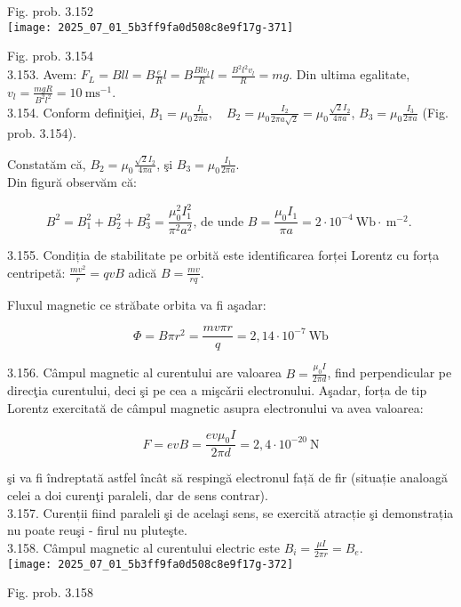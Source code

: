 Fig. prob. 3.152\\
\texttt{[image: 2025\_07\_01\_5b3ff9fa0d508c8e9f17g-371]}

Fig. prob. 3.154\\
3.153. Avem: $F_{L}=B l l=B \frac{e}{R} l=B \frac{B l v_{l}}{R} l=\frac{B^{2} l^{2} v_{l}}{R}=m g$. Din ultima egalitate, $v_{l}=\frac{m g R}{B^{2} l^{2}}=10 \mathrm{~ms}^{-1}$.\\
3.154. Conform definiţiei, $B_{1}=\mu_{0} \frac{I_{1}}{2 \pi a}, \quad B_{2}=\mu_{0} \frac{I_{2}}{2 \pi a \sqrt{2}}=\mu_{0} \frac{\sqrt{2} I_{2}}{4 \pi a}$, $B_{3}=\mu_{0} \frac{I_{3}}{2 \pi a}$ (Fig. prob. 3.154).

Constatăm că, $B_{2}=\mu_{0} \frac{\sqrt{2} I_{2}}{4 \pi a}$, şi $B_{3}=\mu_{0} \frac{I_{1}}{2 \pi a}$.\\
Din figură observăm că:

$$
B^{2}=B_{1}^{2}+B_{2}^{2}+B_{3}^{2}=\frac{\mu_{0}^{2} I_{1}^{2}}{\pi^{2} a^{2}} \text {, de unde } B=\frac{\mu_{0} I_{1}}{\pi a}=2 \cdot 10^{-4} \mathrm{~Wb} \cdot \mathrm{~m}^{-2} \text {. }
$$

3.155. Condiția de stabilitate pe orbită este identificarea forței Lorentz cu forța centripetă: $\frac{m v^{2}}{r}=q v B$ adică $B=\frac{m v}{r q}$.

Fluxul magnetic ce străbate orbita va fi aşadar:

$$
\Phi=B \pi r^{2}=\frac{m v \pi r}{q}=2,14 \cdot 10^{-7} \mathrm{~Wb}
$$

3.156. Câmpul magnetic al curentului are valoarea $B=\frac{\mu_{0} I}{2 \pi d}$, find perpendicular pe direcţia curentului, deci şi pe cea a mişcǎrii electronului. Aşadar, forța de tip Lorentz exercitată de câmpul magnetic asupra electronului va avea valoarea:

$$
F=e v B=\frac{e v \mu_{0} I}{2 \pi d}=2,4 \cdot 10^{-20} \mathrm{~N}
$$

şi va fi îndreptată astfel încât să respingă electronul față de fir (situație analoagă celei a doi curenţi paraleli, dar de sens contrar).\\
3.157. Curenții fiind paraleli şi de acelaşi sens, se exercită atracție şi demonstrația nu poate reuşi - firul nu pluteşte.\\
3.158. Câmpul magnetic al curentului electric este $B_{i}=\frac{\mu I}{2 \pi r}=B_{e}$.\\
\texttt{[image: 2025\_07\_01\_5b3ff9fa0d508c8e9f17g-372]}

Fig. prob. 3.158


